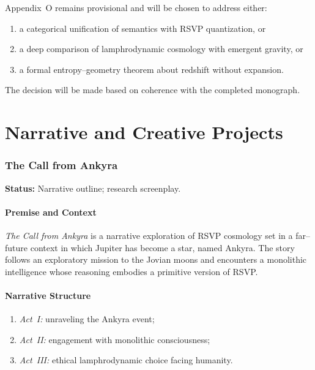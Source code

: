 \documentclass[12pt]{article}
\theoremstyle{plain}
\theoremstyle{definition}
\theoremstyle{remark}
\begin{document}
Appendix~O remains provisional and will be chosen to address either:
\begin{enumerate}
    \item a categorical unification of semantics with RSVP quantization, or
    \item a deep comparison of lamphrodynamic cosmology with emergent gravity,
    or
    \item a formal entropy--geometry theorem about redshift without expansion.
\end{enumerate}

The decision will be made based on coherence with the completed monograph.


\newpage

\part{Narrative and Creative Projects}


\section{The Call from Ankyra}

\textbf{Status:} Narrative outline; research screenplay.

\subsection{Premise and Context}

\emph{The Call from Ankyra} is a narrative exploration of RSVP cosmology set in
a far--future context in which Jupiter has become a star, named Ankyra. The
story follows an exploratory mission to the Jovian moons and encounters a
monolithic intelligence whose reasoning embodies a primitive version of RSVP.


\subsection{Narrative Structure}

\begin{enumerate}
    \item \textit{Act~I:} unraveling the Ankyra event;
    \item \textit{Act~II:} engagement with monolithic consciousness;
    \item \textit{Act~III:} ethical lamphrodynamic choice facing humanity.
\end{enumerate}
\end{document}
